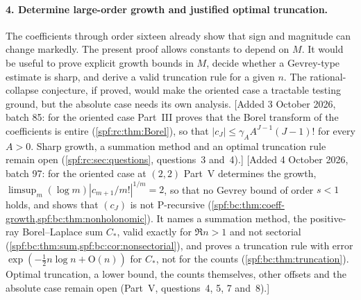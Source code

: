\documentclass[11pt]{article}
\numberwithin{equation}{section}
\theoremstyle{definition}
\theoremstyle{remark}
\theoremstyle{definition}
\newcommand{\bigO}{\mathrm O}
\newcommand{\bcC}{C_{\!*}}
\begin{document}
\paragraph{4. Determine large-order growth and justified optimal truncation.}
The coefficients through order sixteen already show that sign and magnitude
can change markedly. The present proof allows constants to depend on $M$.
It would be useful to prove explicit growth bounds in $M$, decide whether a
Gevrey-type estimate is sharp, and derive a valid truncation rule for a given
$n$. The rational-collapse conjecture, if proved, would make the oriented
case a tractable testing ground, but the absolute case needs its own analysis.
[Added 3 October 2026, batch 85: for the oriented case Part~III proves that
the Borel transform of the coefficients is entire
(\cref{spf:rc:thm:Borel}), so that $|c_J|\le\gamma_AA^{J-1}(J-1)!$ for every
$A>0$. Sharp growth, a summation method and an optimal truncation rule
remain open (\cref{spf:rc:sec:questions}, questions~3 and~4).]
[Added 4 October 2026, batch 97: for the oriented case at $(2,2)$ Part~V
determines the growth, $\limsup_m(\log m)|c_{m+1}/m!|^{1/m}=2$, so that no
Gevrey bound of order $s<1$ holds, and shows that $(c_J)$ is not P-recursive
(\cref{spf:bc:thm:coeff-growth,spf:bc:thm:nonholonomic}). It names a
summation method, the positive-ray Borel--Laplace sum $\bcC$, valid exactly
for $\Re n>1$ and not sectorial (\cref{spf:bc:thm:sum,spf:bc:cor:nonsectorial}),
and proves a truncation rule with error $\exp(-\frac12n\log n+\bigO(n))$ for
$\bcC$, not for the counts (\cref{spf:bc:thm:truncation}). Optimal
truncation, a lower bound, the counts themselves, other offsets and the
absolute case remain open (Part~V, questions~4, 5, 7 and~8).]
\end{document}
